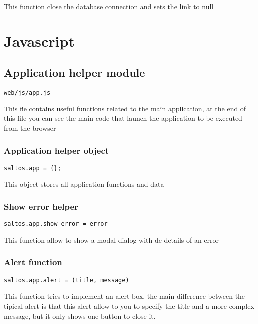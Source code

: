 \documentclass[a4paper]{book}
\begin{document}
This function close the database connection and sets the link to null


\hypertarget{toc367}{}
\chapter{Javascript}

\hypertarget{toc368}{}
\section{Application helper module}

\begin{lstlisting}
web/js/app.js
\end{lstlisting}

This fie contains useful functions related to the main application, at the end of this file you
can see the main code that launch the application to be executed from the browser

\hypertarget{toc369}{}
\subsection{Application helper object}

\begin{lstlisting}
saltos.app = {};
\end{lstlisting}

This object stores all application functions and data

\hypertarget{toc370}{}
\subsection{Show error helper}

\begin{lstlisting}
saltos.app.show_error = error
\end{lstlisting}

This function allow to show a modal dialog with de details of an error

\hypertarget{toc371}{}
\subsection{Alert function}

\begin{lstlisting}
saltos.app.alert = (title, message)
\end{lstlisting}

This function tries to implement an alert box, the main difference between the tipical alert
is that this alert allow to you to specify the title and a more complex message, but it only
shows one button to close it.
\end{document}
